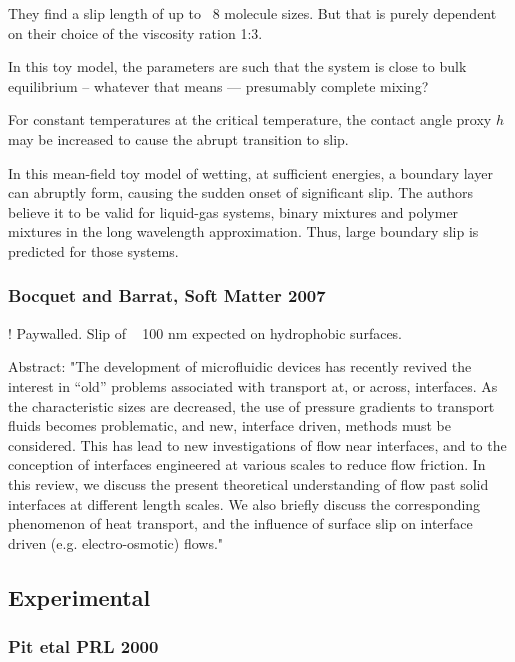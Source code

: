 \documentclass[twocolumn]{article}
\begin{document}
They find a slip length of up to ~8 molecule sizes.  But that is purely dependent on their choice of the viscosity ration 1:3.

In this toy model, the parameters are such that the system is close to bulk equilibrium -- whatever that means --- presumably complete mixing?

For constant temperatures at the critical temperature, the contact angle proxy $h$ may be increased to cause the abrupt transition to slip.

In this mean-field toy model of wetting, at sufficient energies, a boundary layer can abruptly form, causing the sudden onset of significant slip. The authors believe it to be valid for liquid-gas systems, binary mixtures and polymer mixtures in the long wavelength approximation. Thus, large boundary slip is predicted for those systems.


\subsubsection*{Bocquet and Barrat, Soft Matter 2007}
! Paywalled.
Slip of ~ 100 nm expected on hydrophobic surfaces.

Abstract: "The development of microfluidic devices has recently revived the interest in “old” problems associated with transport at, or across, interfaces. As the characteristic sizes are decreased, the use of pressure gradients to transport fluids becomes problematic, and new, interface driven, methods must be considered. This has lead to new investigations of flow near interfaces, and to the conception of interfaces engineered at various scales to reduce flow friction. In this review, we discuss the present theoretical understanding of flow past solid interfaces at different length scales. We also briefly discuss the corresponding phenomenon of heat transport, and the influence of surface slip on interface driven (e.g. electro-osmotic) flows."

\subsection*{Experimental}

\subsubsection*{Pit etal PRL 2000}
\end{document}
